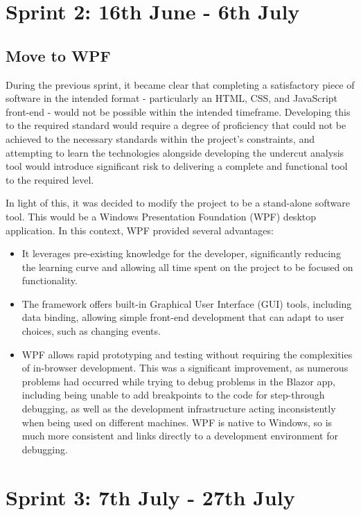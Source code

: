 \section{Sprint 2: 16th June - 6th July}

\subsection{Move to WPF}

During the previous sprint, it became clear that completing a satisfactory piece of software in the intended format - particularly an HTML, CSS, and JavaScript front-end - would not be possible within the intended timeframe. Developing this to the required standard would require a degree of proficiency that could not be achieved to the necessary standards within the project's constraints, and attempting to learn the technologies alongside developing the undercut analysis tool would introduce significant risk to delivering a complete and functional tool to the required level. 

In light of this, it was decided to modify the project to be a stand-alone software tool. This would be a Windows Presentation Foundation (WPF) desktop application. In this context, WPF provided several advantages:

\begin{itemize}
    \item It leverages pre-existing knowledge for the developer, significantly reducing the learning curve and allowing all time spent on the project to be focused on functionality.
    \item The framework offers built-in Graphical User Interface (GUI) tools, including data binding, allowing simple front-end development that can adapt to user choices, such as changing events.
    \item WPF allows rapid prototyping and testing without requiring the complexities of in-browser development. This was a significant improvement, as numerous problems had occurred while trying to debug problems in the Blazor app, including being unable to add breakpoints to the code for step-through debugging, as well as the development infrastructure acting inconsistently when being used on different machines. WPF is native to Windows, so is much more consistent and links directly to a development environment for debugging.
\end{itemize}



\section{Sprint 3: 7th July - 27th July}
